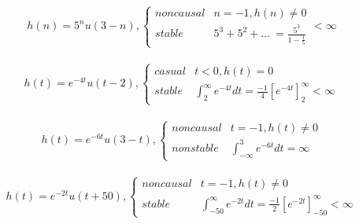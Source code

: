 \documentclass{article}[12pt]
\begin{document}
\begin{equation}
	\begin{gathered}
		h( n) =5^{n} u( 3-n) ,\begin{cases}
			noncausal & n=-1,h( n) \neq 0\\
			stable & 5^{3} +5^{2} +...\ =\frac{5^{3}}{1-\frac{1}{5}}
		\end{cases} < \infty 
	\end{gathered}
\end{equation}


\begin{equation}
	\begin{gathered}
		h( t) =e^{-4t} u( t-2) ,\begin{cases}
			casual & t< 0,h( t) =0\\
			stable & \int _{2}^{\infty } e^{-4t} dt=\frac{-1}{4}\left[ e^{-4t}\right]_{2}^{\infty } < \infty 
		\end{cases}
	\end{gathered}
\end{equation}


\begin{equation}
	\begin{gathered}
		h( t) =e^{-6t} u( 3-t) ,\begin{cases}
			noncausal & t=-1,h( t) \neq 0\\
			nonstable & \int _{-\infty }^{3} e^{-6t} dt=\infty 
		\end{cases}
	\end{gathered}
\end{equation}


\begin{equation}
	\begin{gathered}
		h( t) =e^{-2t} u( t+50) ,\begin{cases}
			noncausal & t=-1,h( t) \neq 0\\
			stable & \int _{-50}^{\infty } e^{-2t} dt=\frac{-1}{2}\left[ e^{-2t}\right]_{-50}^{\infty } < \infty 
		\end{cases}
	\end{gathered}
\end{equation}
\end{document}
